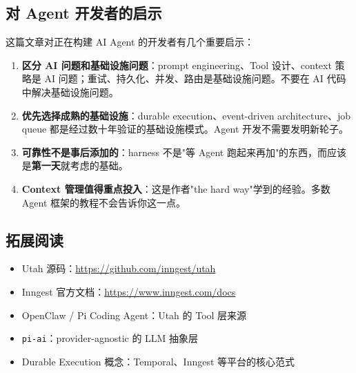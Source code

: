 \documentclass[a4paper]{article}
\begin{document}
\subsection{对 Agent 开发者的启示}

这篇文章对正在构建 AI Agent 的开发者有几个重要启示：

\begin{enumerate}
    \item \textbf{区分 AI 问题和基础设施问题}：prompt engineering、Tool 设计、context 策略是 AI 问题；重试、持久化、并发、路由是基础设施问题。不要在 AI 代码中解决基础设施问题。
    \item \textbf{优先选择成熟的基础设施}：durable execution、event-driven architecture、job queue 都是经过数十年验证的基础设施模式。Agent 开发不需要发明新轮子。
    \item \textbf{可靠性不是事后添加的}：harness 不是"等 Agent 跑起来再加"的东西，而应该是\textbf{第一天}就考虑的基础。
    \item \textbf{Context 管理值得重点投入}：这是作者"the hard way"学到的经验。多数 Agent 框架的教程不会告诉你这一点。
\end{enumerate}

\subsection{拓展阅读}

\begin{itemize}
    \item Utah 源码：\url{https://github.com/inngest/utah}
    \item Inngest 官方文档：\url{https://www.inngest.com/docs}
    \item OpenClaw / Pi Coding Agent：Utah 的 Tool 层来源
    \item \texttt{pi-ai}：provider-agnostic 的 LLM 抽象层
    \item Durable Execution 概念：Temporal、Inngest 等平台的核心范式
\end{itemize}

\end{document}
